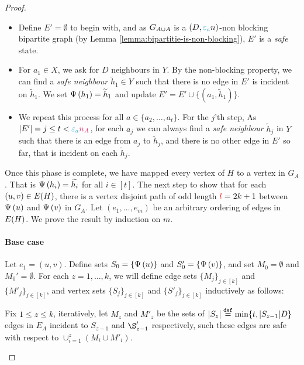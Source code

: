 \documentclass[11pt]{article}
\begin{document}
\begin{proof}
\begin{itemize}
	\item Define $E' = \emptyset$ to begin with, and as $G_{A \cup A}$ is a $(D, \epsilonA n)$-non blocking bipartite graph (by Lemma \ref{lemma:bipartitie-is-non-blocking}), $E'$ is a \emph{safe} state.
	\item For $a_1 \in X$, we ask for $D$ neighbours in $Y$. By the non-blocking property, we can find a \emph{safe neighbour} $\tilde{h}_1 \in Y$ such that there is no edge in $E'$ is incident on $\tilde{h}_1$. We set $\Psi\left(h_1\right) = \widetilde{h}_1$ and update $E' = E'  \cup \{(a_1, \tilde{h}_1)\}$.
	\item We repeat this process for all $a \in \{a_2, \dots, a_t\}$. For the $j$'th step, As $|E'| = j \leq t < \epsilonA\na$, for each $a_j$ we can always find a \emph{safe neighbour} $\tilde{h}_j$ in $Y$ such that there is an edge from $a_j$ to $\tilde{h}_j$, and there is no other edge in $E'$ so far, that is incident on each $\tilde{h}_j$.
\end{itemize}

Once this phase is complete, we have mapped every vertex of $H$ to a vertex in $G_A$.
That is $\Psi\left(h_i\right) = \widetilde{h_i}$ for all $i \in [t]$.
The next step to show that for each $(u,v) \in E(H)$, there is a vertex disjoint path of odd length $\textcolor{red}{l} = 2k+1$ between $\Psi\left(u\right)$ and $\Psi\left(v\right)$ in $G_A$.
Let $(e_1, \dots, e_m)$ be an arbitrary ordering of edges in $E(H)$.
We prove the result by induction on $m$.

\paragraph{Base case} 

Let $e_1 = (u,v)$. Define sets $S_0 = \{\Psi\left(u\right)\}$ and $S'_0 = \{ \Psi\left(v\right)\}$, and set $M_0 = \emptyset$ and $M_0' = \emptyset$.
For each $z=1, \dots, k$, we will define edge sets $\{ M_j\}_{j \in [k]}$ and $ \{ M'_j\}_{j \in [k]}$, and vertex sets $\{ S_j\}_{j \in [k]}$ and $\{ S'_j\}_{j \in [k]}$ inductively as follows:

\begin{tcolorbox}
Fix $ 1 \leq z \leq k$, iteratively, let $M_z$ and $M'_z$ be the sets of $|S_z| \text{}\overset{\mathtt{def}}{=} \min\{t, |S_{z-1}|D\}$ edges in $E_A$ incident to $S_{z-1}$ and $\S_{z-1}'$ respectively, such these edges are safe with respect to $\cup_{i=1}^{z} (M_i \cup M'_i)$.\\



\end{tcolorbox}
\end{proof}
\end{document}

